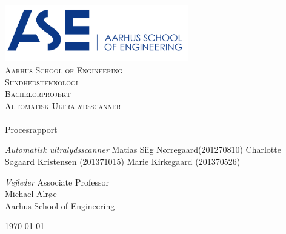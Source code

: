 \begin{titlingpage}
\begin{center}

~ \\[3cm]

\includegraphics[width=0.6\textwidth]{figurer/ASE}~\\[1cm]

\textsc{\LARGE Aarhus School of Engineering}\\[1.5cm]

\textsc{\Large Sundhedsteknologi}\\
\textsc{\Large Bachelorprojekt}\\[0.5cm]
\textsc{\Large Automatisk Ultralydsscanner} \\[1cm]

\noindent\makebox[\linewidth]{\rule{\textwidth}{0.4pt}}\\
[0.5cm]{\Huge Procesrapport}
\noindent\makebox[\linewidth]{\rule{\textwidth}{0.4pt}}

\end{center}

\textit{Automatisk ultralydsscanner} \newline
Matias Siig Nørregaard(201270810) \newline
Charlotte Søgaard Kristensen (201371015) \newline		 
Marie Kirkegaard (201370526) \newline 


\textit{Vejleder} \newline
Associate Professor\\
Michael Alrøe\\
Aarhus School of Engineering


\vfill

\begin{center}
{\large \today}
\end{center}

\end{titlingpage}